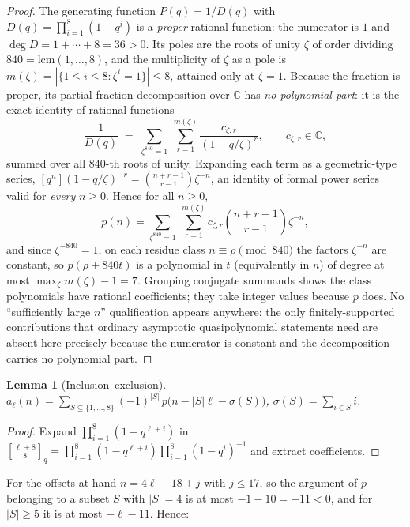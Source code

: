 \documentclass[11pt]{article}
\newtheorem{lemma}[theorem]{Lemma}
\theoremstyle{definition}
\newcommand{\gauss}[2]{\genfrac{[}{]}{0pt}{0}{#1}{#2}_q}
\newcommand{\coeff}[1]{[q^{#1}]}
\begin{document}
\begin{proof}
The generating function $P(q)=1/D(q)$ with $D(q)=\prod_{i=1}^{8}(1-q^i)$ is a \emph{proper} rational
function: the numerator is $1$ and $\deg D=1+\cdots+8=36>0$. Its poles are the roots of unity
$\zeta$ of order dividing $840=\mathrm{lcm}(1,\dots,8)$, and the multiplicity of $\zeta$ as a pole
is $m(\zeta)=|\{1\le i\le 8: \zeta^i=1\}|\le 8$, attained only at $\zeta=1$. Because the fraction
is proper, its partial fraction decomposition over $\mathbb{C}$ has \emph{no polynomial part}: it is
the exact identity of rational functions
\[
  \frac{1}{D(q)}
  \;=\;\sum_{\zeta^{840}=1}\ \sum_{r=1}^{m(\zeta)}
        \frac{c_{\zeta,r}}{(1-q/\zeta)^{r}},
  \qquad c_{\zeta,r}\in\mathbb{C},
\]
summed over all $840$-th roots of unity. Expanding each term as a geometric-type series,
$\coeff{n}(1-q/\zeta)^{-r}=\binom{n+r-1}{r-1}\zeta^{-n}$, an identity of formal power series valid
for \emph{every} $n\ge0$. Hence for all $n\ge0$,
\[
  p(n)=\sum_{\zeta^{840}=1}\ \sum_{r=1}^{m(\zeta)}
        c_{\zeta,r}\binom{n+r-1}{r-1}\zeta^{-n},
\]
and since $\zeta^{-840}=1$, on each residue class $n\equiv\rho\pmod{840}$ the factors $\zeta^{-n}$
are constant, so $p(\rho+840t)$ is a polynomial in $t$ (equivalently in $n$) of degree at most
$\max_\zeta m(\zeta)-1=7$. Grouping conjugate summands shows the class polynomials have rational
coefficients; they take integer values because $p$ does. No ``sufficiently large $n$'' qualification
appears anywhere: the only finitely-supported contributions that ordinary asymptotic quasipolynomial
statements need are absent here precisely because the numerator is constant and the decomposition
carries no polynomial part.
\end{proof}

\begin{lemma}[Inclusion--exclusion]\label{lem:ie}
$a_\ell(n)=\sum_{S\subseteq\{1,\dots,8\}}(-1)^{|S|}\,p\bigl(n-|S|\ell-\sigma(S)\bigr)$,
$\sigma(S)=\sum_{i\in S}i$.
\end{lemma}

\begin{proof}
Expand $\prod_{i=1}^{8}(1-q^{\ell+i})$ in
$\gauss{\ell+8}{8}=\prod_{i=1}^{8}(1-q^{\ell+i})\prod_{i=1}^{8}(1-q^i)^{-1}$ and extract
coefficients.
\end{proof}

For the offsets at hand $n=4\ell-18+j$ with $j\le17$, so the argument of $p$ belonging to a subset
$S$ with $|S|=4$ is at most $-1-10=-11<0$, and for $|S|\ge5$ it is at most $-\ell-11$. Hence:
\end{document}
